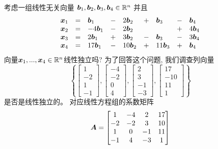 \begin{example}
考虑一组线性无关向量
$\boldsymbol{b}_1,\boldsymbol{b}_2,\boldsymbol{b}_3,\boldsymbol{b}_4 \in \mathbb{R}^n$
并且
\begin{equation}
    \begin{aligned}
        \begin{array}{lllllllll}
            \boldsymbol{x}_1 &=&  \boldsymbol{b}_1   &-& 2\boldsymbol{b}_2  &+&\boldsymbol{b}_3    &-& \boldsymbol{b}_4 \\
            \boldsymbol{x}_2 &=&  -4\boldsymbol{b}_1 &-& 2\boldsymbol{b}_2  & &                    &+& 4\boldsymbol{b}_4 \\
            \boldsymbol{x}_3 &=&  2\boldsymbol{b}_1  &+& 3\boldsymbol{b}_2  &-&\boldsymbol{b}_3    &-& 3\boldsymbol{b}_4 \\
            \boldsymbol{x}_4 &=&  17\boldsymbol{b}_1 &-& 10\boldsymbol{b}_2 &+&11\boldsymbol{b}_3  &+& \boldsymbol{b}_4 \\
        \end{array}
    \end{aligned}
\end{equation}
向量$\boldsymbol{x}_1,...,\boldsymbol{x}_4 \in \mathbb{R}^n$线性独立吗?
为了回答这个问题, 我们调查列向量
\begin{equation}
    \left\{
    \begin{bmatrix}
        1 \\ -2 \\ 1 \\ -1
    \end{bmatrix},
    \begin{bmatrix}
        -4 \\ -2 \\ 0 \\ 4
    \end{bmatrix},
    \begin{bmatrix}
        2 \\ 3 \\ -1 \\ -3
    \end{bmatrix},
    \begin{bmatrix}
        17 \\ -10 \\ 11\\ 1
    \end{bmatrix}
    \right\}
\end{equation}
是否是线性独立的。
对应线性方程组的系数矩阵
\begin{equation}
    \boldsymbol{A}=
    \begin{bmatrix}
        1 & -4 & 2 & 17 \\
        -2 & -2 & 3 & 10 \\
        1 & 0 & -1 & 11 \\
        -1 & 4 & -3 & 1 \\

\end{bmatrix}
\end{equation}
\end{example}
